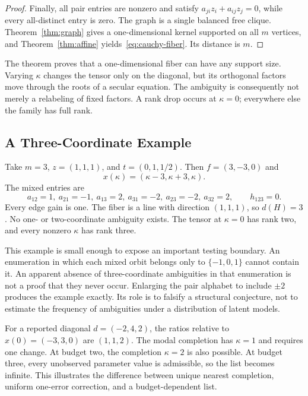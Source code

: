 \begin{proof}
Finally, all pair entries are nonzero and satisfy $a_{ji}z_i+a_{ij}z_j=0$, while every all-distinct entry is zero. The graph is a single balanced free clique. Theorem~\ref{thm:graph} gives a one-dimensional kernel supported on all $m$ vertices, and Theorem~\ref{thm:affine} yields~\eqref{eq:cauchy-fiber}. Its distance is $m$.
\end{proof}

The theorem proves that a one-dimensional fiber can have any support size. Varying $\kappa$ changes the tensor only on the diagonal, but its orthogonal factors move through the roots of a secular equation. The ambiguity is consequently not merely a relabeling of fixed factors. A rank drop occurs at $\kappa=0$; everywhere else the family has full rank.

\subsection{A Three-Coordinate Example}
Take $m=3$, $z=(1,1,1)$, and $t=(0,1,1/2)$. Then $f=(3,-3,0)$ and
\[
 x(\kappa)=(\kappa-3,\kappa+3,\kappa).
\]
The mixed entries are
\begin{equation}\label{eq:three-example}
 a_{12}=1,\ a_{21}=-1,\ a_{13}=2,\ a_{31}=-2,
 \ a_{23}=-2,\ a_{32}=2,\qquad h_{123}=0.
\end{equation}
Every edge gain is one. The fiber is a line with direction $(1,1,1)$, so $d(H)=3$. No one- or two-coordinate ambiguity exists. The tensor at $\kappa=0$ has rank two, and every nonzero $\kappa$ has rank three.

This example is small enough to expose an important testing boundary. An enumeration in which each mixed orbit belongs only to $\{-1,0,1\}$ cannot contain it. An apparent absence of three-coordinate ambiguities in that enumeration is not a proof that they never occur. Enlarging the pair alphabet to include $\pm2$ produces the example exactly. Its role is to falsify a structural conjecture, not to estimate the frequency of ambiguities under a distribution of latent models.

For a reported diagonal $d=(-2,4,2)$, the ratios relative to $x(0)=(-3,3,0)$ are $(1,1,2)$. The modal completion has $\kappa=1$ and requires one change. At budget two, the completion $\kappa=2$ is also possible. At budget three, every unobserved parameter value is admissible, so the list becomes infinite. This illustrates the difference between unique nearest completion, uniform one-error correction, and a budget-dependent list.


